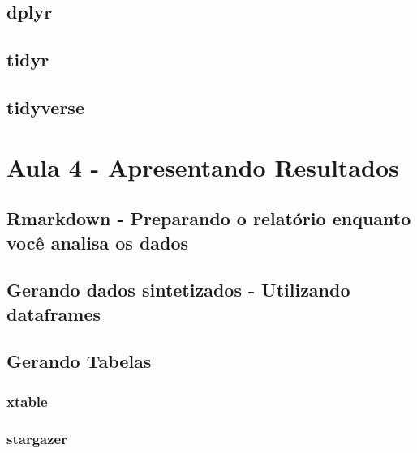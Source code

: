 \documentclass[12pt,a4paper,oneside]{erdc}
\begin{document}
	\section{dplyr}
	
	\section{tidyr}
	
	\section{tidyverse}






%
%

\chapter{Aula 4 - Apresentando Resultados}

	\section{Rmarkdown - Preparando o relatório enquanto você analisa os dados}
	
	\section{Gerando dados sintetizados - Utilizando dataframes}
	
	\section{Gerando Tabelas}
	
		\subsection{xtable}
		
		\subsection{stargazer}





%
%
\end{document}

